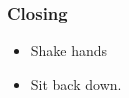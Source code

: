 \begin{frame}
\begin{itemize}


\end{itemize} 
\end{frame}

\begin{frame}
\frametitle{Closing}
\begin{itemize}
\item Shake hands 
\item Sit back down.
\end{itemize}
\end{frame} 
